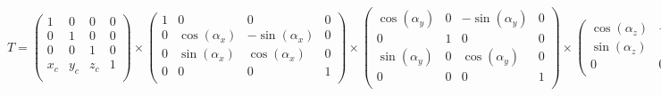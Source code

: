 $
T = 
\begin{pmatrix}
    1 & 0 & 0 & 0 \\
    0 & 1 & 0 & 0 \\
    0 & 0 & 1 & 0 \\
    x_c & y_c & z_c & 1 \\
\end{pmatrix} 
\times 
\begin{pmatrix}
    1 & 0 & 0 & 0 \\
    0 & \cos(\alpha_x) & -\sin(\alpha_x) & 0 \\
    0 & \sin(\alpha_x) & \cos(\alpha_x) & 0 \\
    0 & 0 & 0 & 1 \\
\end{pmatrix}
\times 
\begin{pmatrix}
    \cos(\alpha_y) & 0 & -\sin(\alpha_y) & 0 \\
    0 & 1 & 0 & 0 \\
    \sin(\alpha_y) & 0 & \cos(\alpha_y) & 0 \\
    0 & 0 & 0 & 1 \\
\end{pmatrix}
\times 
\begin{pmatrix}
    \cos(\alpha_z) & -\sin(\alpha_z) & 0 & 0\\
    \sin(\alpha_z) & \cos(\alpha_z) & 0 & 0\\
    0 & 0 & 0 & 1 \\
\end{pmatrix}
\times
\begin{pmatrix}
    s_x & 0 & 0 & 0 \\
    0 & s_y & 0 & 0 \\
    0 & 0 & s_z & 0 \\
    0 & 0 & 0 & 1 \\
\end{pmatrix}
\times
\begin{pmatrix}
    1 & 0 & 0 & 0 \\
    0 & 1 & 0 & 0 \\
    0 & 0 & 1 & 0 \\
    dx & dy & dz & 1 \\
\end{pmatrix}
\times
\begin{pmatrix}
    1 & 0 & 0 & 0 \\
    0 & 1 & 0 & 0 \\
    0 & 0 & 1 & 0 \\
    -x_c & -y_c & -z_c & 1 \\
\end{pmatrix}
$


